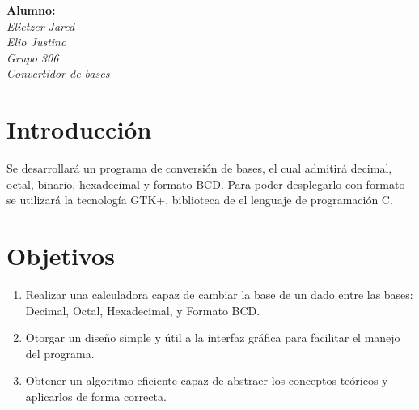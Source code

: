 \documentclass[letterpaper,12pt]{extarticle}%
\begin{document}
    \newpage
    \tableofcontents
    \newpage
    
    \begin{center}
    \textbf{ Alumno:}\\[3mm]
    {\it Elietzer Jared}\\[3mm]
    {\it Elio Justino}\\[3mm]
    {\it Grupo 306}\\[3mm]
    {\it Convertidor de bases}\\[3mm]
    \end{center}
    


	\begin{multicols}{2}
    \section{Introducción}
    
		Se desarrollará un programa de conversión de 
		bases, el cual admitirá decimal, octal, binario, hexadecimal
		y formato BCD. Para poder desplegarlo con formato
		se utilizará la tecnología GTK+, biblioteca
		de el lenguaje de programación C. 

        
    \section{Objetivos}
			
    \begin{enumerate}
		\item Realizar una calculadora capaz de cambiar la base de un
		dado entre las bases: Decimal, Octal, Hexadecimal,
		y Formato BCD.

		\item Otorgar un diseño simple y útil a la interfaz gráfica
		para facilitar el manejo del programa.

		\item Obtener un algoritmo eficiente capaz de abstraer los conceptos       		teóricos y aplicarlos de forma correcta.
	

\end{enumerate}
\end{multicols}
\end{document}
